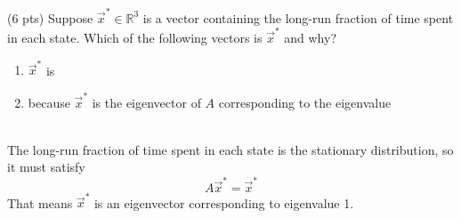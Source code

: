 \documentclass[11pt]{article}
\begin{document}
\begin{prob}[(12 pts)]
\begin{subprob}(6 pts)
    Suppose $\vec x^* \in \mathbb{R}^3$ is a vector containing the long-run fraction of time spent in each state. Which of the following vectors is $\vec x^*$ and why? \\
    \begin{enumerate}
        \item $\vec x^*$ is \: \:      \\
        \item because $\vec x^*$ is the eigenvector of $A$ corresponding to the eigenvalue \\ \\     
    \end{enumerate}

\begin{solution}
The long-run fraction of time spent in each state is the stationary distribution, so it must satisfy
\[
A\vec x^* = \vec x^*
\]
That means $\vec x^*$ is an eigenvector corresponding to eigenvalue 1.


\end{solution}
\end{subprob}
\end{prob}
\end{document}
